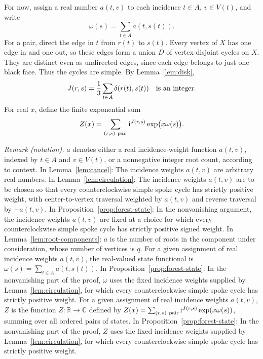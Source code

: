 \documentclass[11pt]{article}
\theoremstyle{remark}
\newcommand{\ii}{\mathrm i}
\numberwithin{equation}{section}
\begin{document}
For now, assign a real number \(a(t,v)\) to each incidence
\(t\in A\), \(v\in V(t)\), and write
\[
 \omega(s)=\sum_{t\in A}a(t,s(t)).
\]
For a pair, direct the edge in \(t\) from \(r(t)\) to
\(s(t)\). Every vertex of \(X\) has one edge in and one
out, so these edges form a union \(D\) of vertex-disjoint
cycles on \(X\). They are distinct even as undirected
edges, since each edge belongs to just one black face.
Thus the cycles are simple. By Lemma~\ref{lem:disk},
\begin{equation}\label{eq:J}
 J(r,s)=\frac13\sum_{t\in A}\delta(r(t),s(t))
 \quad\hbox{is an integer}.
\end{equation}
For real \(x\), define the finite exponential sum
\begin{equation}\label{eq:Z}
 Z(x)=\sum_{(r,s)\ {\rm pair}}
             \ii^{J(r,s)}\exp\bigl(x\omega(s)\bigr).
\end{equation}

\noindent\textit{Remark (notation).} $a$ denotes either a real incidence-weight function $a(t,v)$, indexed by $t\in A$ and $v\in V(t)$, or a nonnegative integer root count, according to context. In Lemma~\ref{lem:cancel}: The incidence weights $a(t,v)$ are arbitrary real numbers. In Lemma~\ref{lem:circulation}: The incidence weights $a(t,v)$ are to be chosen so that every counterclockwise simple spoke cycle has strictly positive weight, with center-to-vertex traversal weighted by $a(t,v)$ and reverse traversal by $-a(t,v)$. In Proposition~\ref{prop:forest-state}: In the nonvanishing argument, the incidence weights $a(t,v)$ are fixed at a choice for which every counterclockwise simple spoke cycle has strictly positive signed weight. In Lemma~\ref{lem:root-components}: $a$ is the number of roots in the component under consideration, whose number of vertices is $q$. For a given assignment of real incidence weights $a(t,v)$, the real-valued state functional is $\omega(s)=\sum_{t\in A}a(t,s(t))$. In Proposition~\ref{prop:forest-state}: In the nonvanishing part of the proof, $\omega$ uses the fixed incidence weights supplied by Lemma~\ref{lem:circulation}, for which every counterclockwise simple spoke cycle has strictly positive weight. For a given assignment of real incidence weights $a(t,v)$, $Z$ is the function $Z:\mathbb{R}\longrightarrow\mathbb{C}$ defined by $Z(x)=\sum_{(r,s)\ {\rm pair}}\ii^{J(r,s)}\exp(x\omega(s))$, summing over all ordered pairs of states. In Proposition~\ref{prop:forest-state}: In the nonvanishing part of the proof, $Z$ uses the fixed incidence weights supplied by Lemma~\ref{lem:circulation}, for which every counterclockwise simple spoke cycle has strictly positive weight.
\end{document}
